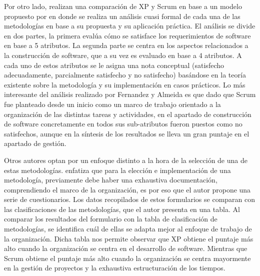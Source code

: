 \documentclass[a4paper,10pt]{article}
\begin{document}
	Por otro lado, \textcite{fernandes2010classification} realizan una comparación de XP y Scrum en base a un modelo propuesto por \textcite{sol1983feature} en donde se realiza un análisis cuasi formal de cada una de las metodologías en base a su propuesta y su aplicación práctica. El análisis se divide en dos partes, la primera evalúa cómo se satisface los requerimientos de software en base a 5 atributos. La segunda parte se centra en los aspectos relacionados a la construcción de software, que a su vez es evaluado en base a 4 atributos. A cada uno de estos atributos se le asigna una nota conceptual (satisfecho adecuadamente, parcialmente satisfecho y no satisfecho) basándose en la teoría existente sobre la metodología y su implementación en casos prácticos. Lo más interesante del análisis realizado por Fernandez y Almeida es que dado que Scrum fue planteado desde un inicio como un marco de trabajo orientado a la organización de las distintas tareas y actividades, en el apartado de construcción de software concretamente en todos sus sub-atributos fueron puestos como no satisfechos, aunque en la síntesis de los resultados se lleva un gran puntaje en el apartado de gestión.
	
	Otros autores optan por un enfoque distinto a la hora de la selección de una de estas metodologías. \textcite{perez2012guia} enfatiza que para la elección e implementación de una metodología, previamente debe haber una exhaustiva documentación, comprendiendo el marco de la organización, es por eso que el autor propone una serie de cuestionarios. Los datos recopilados de estos formularios se comparan con las clasificaciones de las metodologías, que el autor presenta en una tabla. Al comparar los resultados del formulario con la tabla de clasificación de metodologías, se identifica cuál de ellas se adapta mejor al enfoque de trabajo de la organización. Dicha tabla nos permite observar que XP obtiene el puntaje más alto cuando la organización se centra en el desarrollo de software. Mientras que Scrum obtiene el puntaje más alto cuando la organización se centra mayormente en la gestión de proyectos y la exhaustiva estructuración de los tiempos.
	
\end{document}
